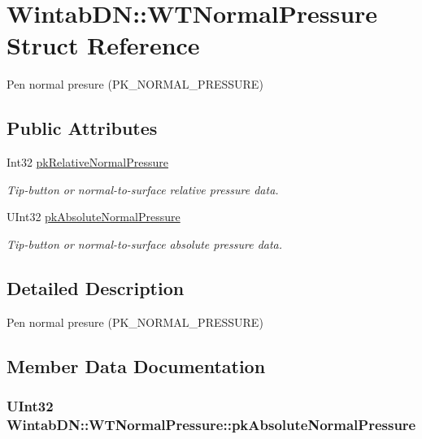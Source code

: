 \hypertarget{struct_wintab_d_n_1_1_w_t_normal_pressure}{
\section{WintabDN::WTNormalPressure Struct Reference}
\label{struct_wintab_d_n_1_1_w_t_normal_pressure}
}


Pen normal presure (PK\_\-NORMAL\_\-PRESSURE)  


\subsection*{Public Attributes}
\begin{DoxyCompactItemize}
\item 
Int32 \hyperlink{struct_wintab_d_n_1_1_w_t_normal_pressure_af0352f6fd2b6c25b19ce82083f698436}{pkRelativeNormalPressure}
\begin{DoxyCompactList}\small\item\em Tip-\/button or normal-\/to-\/surface relative pressure data. \item\end{DoxyCompactList}\item 
UInt32 \hyperlink{struct_wintab_d_n_1_1_w_t_normal_pressure_a0b873c318b3fc8e62b107a9626e3537f}{pkAbsoluteNormalPressure}
\begin{DoxyCompactList}\small\item\em Tip-\/button or normal-\/to-\/surface absolute pressure data. \item\end{DoxyCompactList}\end{DoxyCompactItemize}


\subsection{Detailed Description}
Pen normal presure (PK\_\-NORMAL\_\-PRESSURE) 

\subsection{Member Data Documentation}
\hypertarget{struct_wintab_d_n_1_1_w_t_normal_pressure_a0b873c318b3fc8e62b107a9626e3537f}{
\subsubsection[{pkAbsoluteNormalPressure}]{\setlength{\rightskip}{0pt plus 5cm}UInt32 {\bf WintabDN::WTNormalPressure::pkAbsoluteNormalPressure}}}
\label{struct_wintab_d_n_1_1_w_t_normal_pressure_a0b873c318b3fc8e62b107a9626e3537f}


